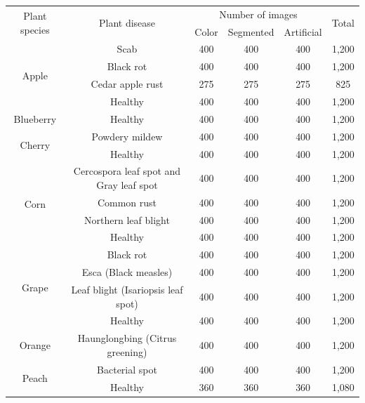\documentclass{BachelorBUI}
\begin{document}
        \begin{table}[h]
            \centering
            \begin{tabular}{@{}c|c|c|c|c|c@{}}
                \hline
                \multirow{2}{*}{Plant species} & \multirow{2}{*}{Plant disease} & \multicolumn{3}{c|}{Number of images} & \multirow{2}{*}{Total} \\ \cline{3-5}
                &  & Color & Segmented & Artificial &  \\ \hline
                \multirow{4}{*}{Apple} & Scab & 400 & 400 & 400 & 1,200 \\ \cline{2-6}
                & Black rot & 400 & 400 & 400 & 1,200 \\ \cline{2-6}
                & Cedar apple rust & 275 & 275 & 275 & 825 \\ \cline{2-6}
                & Healthy & 400 & 400 & 400 & 1,200 \\ \hline
                Blueberry & Healthy & 400 & 400 & 400 & 1,200 \\ \hline
                \multirow{2}{*}{Cherry} & Powdery mildew & 400 & 400 & 400 & 1,200 \\ \cline{2-6}
                & Healthy & 400 & 400 & 400 & 1,200 \\ \hline
                \multirow{4}{*}{Corn} & Cercospora leaf spot and Gray leaf spot & 400 & 400 & 400 & 1,200 \\ \cline{2-6}
                & Common rust & 400 & 400 & 400 & 1,200 \\ \cline{2-6}
                & Northern leaf blight & 400 & 400 & 400 & 1,200 \\ \cline{2-6}
                & Healthy & 400 & 400 & 400 & 1,200 \\ \hline
                \multirow{4}{*}{Grape} & Black rot & 400 & 400 & 400 & 1,200 \\ \cline{2-6}
                & Esca (Black measles) & 400 & 400 & 400 & 1,200 \\ \cline{2-6}
                & Leaf blight (Isariopsis leaf spot) & 400 & 400 & 400 & 1,200 \\ \cline{2-6}
                & Healthy & 400 & 400 & 400 & 1,200 \\ \hline
                Orange & Haunglongbing (Citrus greening) & 400 & 400 & 400 & 1,200 \\ \hline
                \multirow{2}{*}{Peach} & Bacterial spot & 400 & 400 & 400 & 1,200 \\ \cline{2-6}
                & Healthy & 360 & 360 & 360 & 1,080 \\ \hline

\end{tabular}
\end{table}
\end{document}
